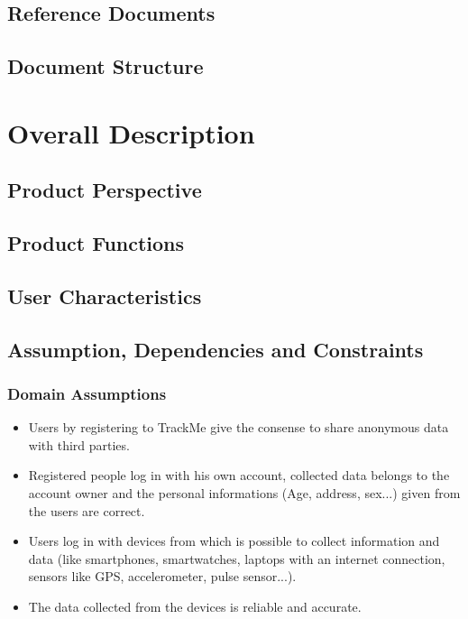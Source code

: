 \documentclass[a4paper]{article}
\begin{document}
\subsection{Reference Documents}

\subsection{Document Structure}

\section{Overall Description}

\subsection{Product Perspective}

\subsection{Product Functions}

\subsection{User Characteristics}

\subsection{Assumption, Dependencies and Constraints}

\subsubsection{Domain Assumptions}


\begin{itemize}[label={[D.\arabic*]}]
    \item Users by registering to TrackMe give the consense to share anonymous data with third parties.
    \item Registered people log in with his own account, collected data belongs to the account owner and the personal informations (Age, address, sex...) given from the users are correct.
    \item Users log in with devices from which is possible to collect information and data (like smartphones, smartwatches, laptops with an internet connection, sensors like GPS, accelerometer, pulse sensor...).
    \item The data collected from the devices is reliable and accurate.
\end{itemize}
\end{document}
